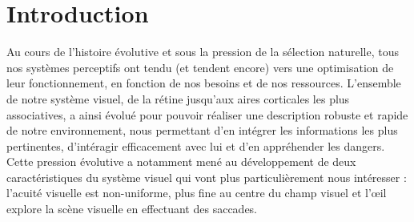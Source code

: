 
\chapter{Introduction} %
\label{Introduction} %


\newcommand{\keyword}[1]{\textbf{#1}}
\newcommand{\tabhead}[1]{\textbf{#1}}
\newcommand{\code}[1]{\texttt{#1}}
\newcommand{\file}[1]{\texttt{\bfseries#1}}
\newcommand{\option}[1]{\texttt{\itshape#1}}


Au cours de l'histoire évolutive et sous la pression de la sélection naturelle, tous nos systèmes perceptifs ont tendu (et tendent encore) vers une optimisation de leur fonctionnement, en fonction de nos besoins et de nos ressources.
L'ensemble de notre système visuel, de la rétine jusqu'aux aires corticales les plus associatives, a ainsi évolué pour pouvoir réaliser une description robuste et rapide de notre environnement, nous permettant d'en intégrer les informations les plus pertinentes, d'intéragir efficacement avec lui et d'en appréhender les dangers.
Cette pression évolutive a notamment mené au développement de deux caractéristiques du système visuel qui vont plus particulièrement nous intéresser : l'acuité visuelle est non-uniforme, plus fine au centre du champ visuel et l'\oe il explore la scène visuelle en effectuant des saccades.~\autocite{Werner2014} \\

